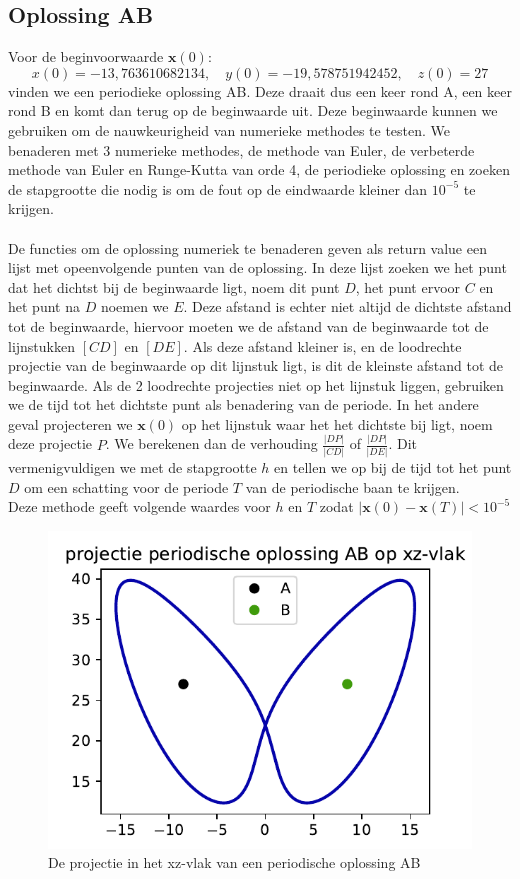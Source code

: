 \documentclass[12pt, a4paper]{article}
\theoremstyle{definition}
\begin{document}
\subsection{Oplossing AB}
Voor de beginvoorwaarde $\textbf{x}(0)$:
$$x(0) =−13,763 610 682 134, \quad y(0) =−19,578 751 942 452, \quad   z(0) = 27$$
vinden we een periodieke oplossing AB. Deze draait dus een keer rond A, een keer rond B en komt dan terug op de beginwaarde uit. Deze beginwaarde kunnen we gebruiken om de nauwkeurigheid van numerieke methodes te testen. We benaderen met 3 numerieke methodes, de methode van Euler, de verbeterde methode van Euler en Runge-Kutta van orde 4, de periodieke oplossing en zoeken de stapgrootte die nodig is om de fout op de eindwaarde kleiner dan $10^{-5}$ te krijgen.\\
\\
De functies om de oplossing numeriek te benaderen geven als return value een lijst met opeenvolgende punten van de oplossing. In deze lijst zoeken we het punt dat het dichtst bij de beginwaarde ligt, noem dit punt $D$, het punt ervoor $C$ en het punt na $D$ noemen we $E$. Deze afstand is echter niet altijd de dichtste afstand tot de beginwaarde, hiervoor moeten we de afstand van de beginwaarde tot de lijnstukken $[CD]$ en $[DE]$. Als deze afstand kleiner is, en de loodrechte projectie van de beginwaarde op dit lijnstuk ligt, is dit de kleinste afstand tot de beginwaarde. Als de 2 loodrechte projecties niet op het lijnstuk liggen, gebruiken we de tijd tot het dichtste punt als benadering van de periode. In het andere geval projecteren we $\textbf{x}(0)$ op het lijnstuk waar het het dichtste bij ligt, noem deze projectie $P$. We berekenen dan de verhouding $\frac{|DP|}{|CD|}$ of $\frac{|DP|}{|DE|}$. Dit vermenigvuldigen we met de stapgrootte $h$ en tellen we op bij de tijd tot het punt $D$ om een schatting voor de periode $T$ van de periodische baan te krijgen.\\
Deze methode geeft volgende waardes voor $h$ en $T$ zodat $|\textbf{x}(0) - \textbf{x}(T)| < 10^{-5}$

\begin{figure}[H]
    \centering
    \includegraphics[width=0.5\linewidth]{projectie_opdracht_3.pdf}
    \caption{De projectie in het xz-vlak van een periodische oplossing AB}
    \label{fig: AB}
\end{figure}
\end{document}
